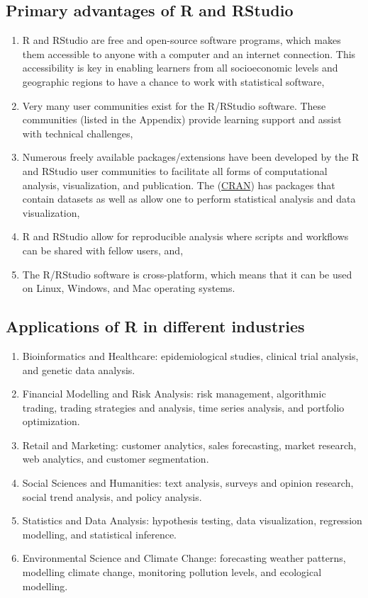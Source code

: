 \documentclass[
  letterpaper,
  DIV=11,
  numbers=noendperiod]{scrreprt}
\begin{document}
\subsection{Primary advantages of R and
RStudio}\label{primary-advantages-of-r-and-rstudio}

\begin{enumerate}
\def\labelenumi{\roman{enumi}.}
\item
  R and RStudio are free and open-source software programs, which makes
  them accessible to anyone with a computer and an internet connection.
  This accessibility is key in enabling learners from all socioeconomic
  levels and geographic regions to have a chance to work with
  statistical software,
\item
  Very many user communities exist for the R/RStudio software. These
  communities (listed in the Appendix) provide learning support and
  assist with technical challenges,
\item
  Numerous freely available packages/extensions have been developed by
  the R and RStudio user communities to facilitate all forms of
  computational analysis, visualization, and publication. The
  (\href{https://cran.r-project.org/}{CRAN}) has packages that contain
  datasets as well as allow one to perform statistical analysis and data
  visualization,
\item
  R and RStudio allow for reproducible analysis where scripts and
  workflows can be shared with fellow users, and,
\item
  The R/RStudio software is cross-platform, which means that it can be
  used on Linux, Windows, and Mac operating systems.
\end{enumerate}

\subsection{Applications of R in different
industries}\label{applications-of-r-in-different-industries}

\begin{enumerate}
\def\labelenumi{\roman{enumi}.}
\item
  Bioinformatics and Healthcare: epidemiological studies, clinical trial
  analysis, and genetic data analysis.
\item
  Financial Modelling and Risk Analysis: risk management, algorithmic
  trading, trading strategies and analysis, time series analysis, and
  portfolio optimization.
\item
  Retail and Marketing: customer analytics, sales forecasting, market
  research, web analytics, and customer segmentation.
\item
  Social Sciences and Humanities: text analysis, surveys and opinion
  research, social trend analysis, and policy analysis.
\item
  Statistics and Data Analysis: hypothesis testing, data visualization,
  regression modelling, and statistical inference.
\item
  Environmental Science and Climate Change: forecasting weather
  patterns, modelling climate change, monitoring pollution levels, and
  ecological modelling.
\end{enumerate}
\end{document}
